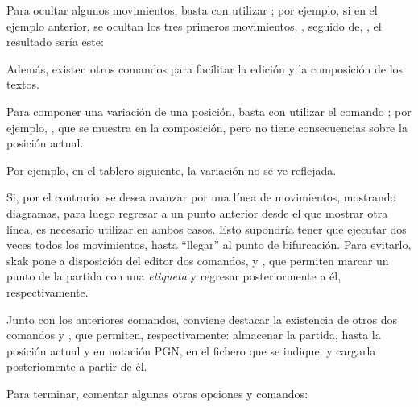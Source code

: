 \documentclass[a4paper,10pt, twocolumn]{article}
\newcommand{\mi}[1]{\texttt{#1}} %
\begin{document}

	
	\showboard
	
	Para ocultar algunos movimientos, basta con utilizar \mi{\hidemoves}; por ejemplo, si en el ejemplo anterior, se ocultan los tres primeros movimientos, \mi{}, seguido de, \mi{}, el resultado sería este:


    \showboard

	Además, existen otros comandos para facilitar la edición y la composición de los textos.
	
	Para componer una variación de una posición, basta con utilizar el comando \mi{\variation}; por ejemplo, \mi{}, que se muestra en la composición, pero no tiene consecuencias sobre la posición actual.
	
    Por ejemplo, en el tablero siguiente, la variación  no se ve reflejada.
    
	\showboard
	
    
	Si, por el contrario, se desea avanzar por una línea de movimientos, mostrando diagramas, para luego regresar a un punto anterior desde el que mostrar otra línea, es necesario utilizar \mi{\mainline} en ambos casos. Esto supondría tener que ejecutar dos veces todos los movimientos, hasta “llegar” al punto de bifurcación. Para evitarlo, {\ttfamily skak} pone a disposición del editor dos comandos, \mi{} y \mi{}, que permiten marcar un punto de la partida con una \emph{etiqueta} y regresar posteriormente a él, respectivamente.
	
	Junto con los anteriores comandos, conviene destacar la existencia de otros dos comandos \mi{} y \mi{}, que permiten, respectivamente: almacenar la partida, hasta la posición actual y en notación PGN,  en el fichero que se indique; y cargarla posteriomente a partir de él.


	Para terminar, comentar algunas otras opciones y comandos:
	
\end{document}
